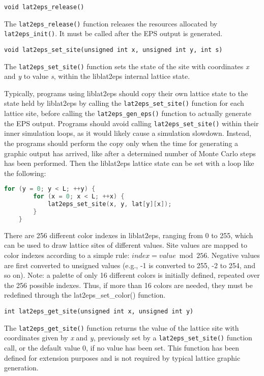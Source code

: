 \documentclass[a4paper]{article}
\begin{document}
\texttt{void lat2eps\_release()}
\bigbreak

The \texttt{lat2eps\_release()} function releases the resources allocated by \texttt{lat2eps\_init()}. It must be called after the EPS output is generated.
\bigbreak\bigbreak


\texttt{void lat2eps\_set\_site(unsigned int x, unsigned int y, int s)}
\bigbreak

The \texttt{lat2eps\_set\_site()} function sets the state of the site with coordinates \textit{x} and \textit{y} to value \textit{s}, within the liblat2eps internal lattice state.
\bigbreak

Typically, programs using liblat2eps should copy their own lattice state to the state held by liblat2eps by calling the \texttt{lat2eps\_set\_site()} function for each lattice site, before calling the \texttt{lat2eps\_gen\_eps()} function to actually generate the EPS output. Programs should avoid calling \texttt{lat2eps\_set\_site()} within their inner simulation loops, as it would likely cause a simulation slowdown. Instead, the programs should perform the copy only when the time for generating a graphic output has arrived, like after a determined number of Monte Carlo steps has been performed. Then the liblat2eps lattice state can be set with a loop like the following:
\bigbreak

\begin{lstlisting}[language=C]
	for (y = 0; y < L; ++y) {
		for (x = 0; x < L; ++x) {
			lat2eps_set_site(x, y, lat[y][x]);
		}
	}
\end{lstlisting}
\bigbreak

There are 256 different color indexes in liblat2eps, ranging from 0 to 255, which can be used to draw lattice sites of different values. Site values are mapped to color indexes according to a simple rule: $index = value \bmod 256$. Negative values are first converted to unsigned values (e.g., -1 is converted to 255, -2 to 254, and so on). Note: a palette of only 16 different colors is initially defined, repeated over the 256 possible indexes. Thus, if more than 16 colors are needed, they must be redefined through the lat2eps\_set\_color() function.
\bigbreak\bigbreak


\texttt{int lat2eps\_get\_site(unsigned int x, unsigned int y)}
\bigbreak

The \texttt{lat2eps\_get\_site()} function returns the value of the lattice site with coordinates given by \textit{x} and \textit{y}, previously set by a \texttt{lat2eps\_set\_site()} function call, or the default value 0, if no value has been set. This function has been defined for extension purposes and is not required by typical lattice graphic generation.
\bigbreak\bigbreak
\end{document}
